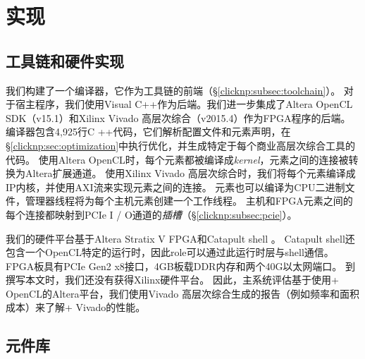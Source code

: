 \section{实现}
\label{clicknp:sec:impl}

\subsection{\name 工具链和硬件实现}

我们构建了一个\name 编译器，它作为\name 工具链的前端（\S \ref {clicknp:subsec:toolchain}）。
对于宿主程序，我们使用Visual C++作为后端。我们进一步集成了Altera OpenCL SDK（v15.1）\cite {aoc}和Xilinx Vivado 高层次综合（v2015.4）\cite {vivado}作为FPGA程序的后端。
\name 编译器包含4,925行C ++代码，它们解析配置文件和元素声明，在\S \ref {clicknp:sec:optimization}中执行优化，并生成特定于每个商业高层次综合工具的代码。
使用Altera OpenCL时，每个\name 元素都被编译成\textit {kernel}，元素之间的连接被转换为Altera扩展通道。
使用Xilinx Vivado 高层次综合时，我们将每个元素编译成IP内核，并使用AXI流来实现元素之间的连接。
元素也可以编译为CPU二进制文件，管理器线程将为每个主机元素创建一个工作线程。
主机和FPGA元素之间的每个连接都映射到PCIe I / O通道的\textit {插槽}（\S \ref {clicknp:subsec:pcie}）。

我们的硬件平台基于Altera Stratix V FPGA和Catapult shell \cite {putnam2014reconfigurable}。
Catapult shell还包含一个OpenCL特定的运行时，因此\name role可以通过此运行时层与shell通信。
FPGA板具有PCIe Gen2 x8接口，4GB板载DDR内存和两个40G以太网端口。
到撰写本文时，我们还没有获得Xilinx硬件平台。
因此，主系统评估基于使用\name + OpenCL的Altera平台，我们使用Vivado 高层次综合生成的报告（例如频率和面积成本）来了解\name + Vivado的性能。

\subsection{\name 元件库}
\label{clicknp:subsec:lib}


